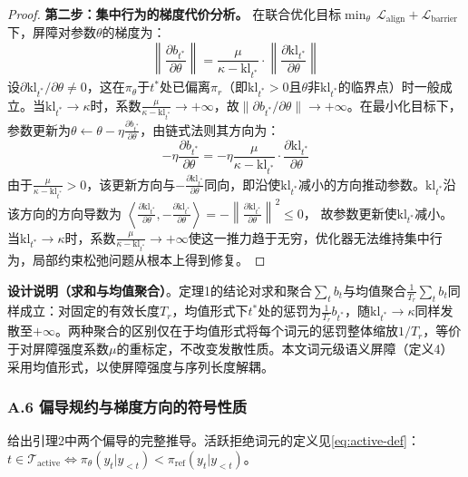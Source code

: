 \documentclass[lettersize,journal]{IEEEtran}
\begin{document}
\begin{proof}
\textbf{第二步：集中行为的梯度代价分析。}
在联合优化目标$\min_\theta\,\mathcal{L}_{\text{align}} + \mathcal{L}_{\text{barrier}}$下，屏障对参数$\theta$的梯度为：
\begin{equation}
    \left\|\frac{\partial b_{t^*}}{\partial \theta}\right\| = 
    \frac{\mu}{\kappa - \mathrm{kl}_{t^*}} \cdot 
    \left\|\frac{\partial \mathrm{kl}_{t^*}}{\partial \theta}\right\|
\end{equation}
设$\partial \mathrm{kl}_{t^*}/\partial \theta \neq 0$，这在$\pi_\theta$于$t^*$处已偏离$\pi_r$（即$\mathrm{kl}_{t^*} > 0$且$\theta$非$\mathrm{kl}_{t^*}$的临界点）时一般成立。当$\mathrm{kl}_{t^*} \to \kappa$时，系数$\frac{\mu}{\kappa - \mathrm{kl}_{t^*}} \to +\infty$，故$\|\partial b_{t^*}/\partial\theta\| \to +\infty$。在最小化目标下，参数更新为$\theta \leftarrow \theta - \eta\frac{\partial b_{t^*}}{\partial\theta}$，由链式法则其方向为：
\begin{equation}
-\eta\frac{\partial b_{t^*}}{\partial\theta} = 
-\eta\frac{\mu}{\kappa - \mathrm{kl}_{t^*}}\cdot
\frac{\partial\mathrm{kl}_{t^*}}{\partial\theta}
\end{equation}
由于$\frac{\mu}{\kappa-\mathrm{kl}_{t^*}} > 0$，该更新方向与$-\frac{\partial\mathrm{kl}_{t^*}}{\partial\theta}$同向，即沿使$\mathrm{kl}_{t^*}$减小的方向推动参数。$\mathrm{kl}_{t^*}$沿该方向的方向导数为
$\left\langle\frac{\partial\mathrm{kl}_{t^*}}{\partial\theta},
-\frac{\partial\mathrm{kl}_{t^*}}{\partial\theta}\right\rangle
= -\left\|\frac{\partial\mathrm{kl}_{t^*}}{\partial\theta} \right\|^2 \leq 0$，
故参数更新使$\mathrm{kl}_{t^*}$减小。当$\mathrm{kl}_{t^*} \to \kappa$时，系数$\frac{\mu}{\kappa - \mathrm{kl}_{t^*}} \to +\infty$使这一推力趋于无穷，优化器无法维持集中行为，局部约束松弛问题从根本上得到修复。
\end{proof}

\textbf{设计说明（求和与均值聚合）}。定理1的结论对求和聚合$\sum_t b_t$与均值聚合$\frac{1}{T_r}\sum_t b_t$同样成立：对固定的有效长度$T_r$，均值形式下$t^*$处的惩罚为$\frac{1}{T_r}b_{t^*}$，随$\mathrm{kl}_{t^*} \to \kappa$同样发散至$+\infty$。两种聚合的区别仅在于均值形式将每个词元的惩罚整体缩放$1/T_r$，等价于对屏障强度系数$\mu$的重标定，不改变发散性质。本文词元级语义屏障（定义4）采用均值形式，以使屏障强度与序列长度解耦。

\subsubsection*{A.6 偏导规约与梯度方向的符号性质}\label{app:active-partial}
给出引理2中两个偏导的完整推导。活跃拒绝词元的定义见\eqref{eq:active-def}：$t \in \mathcal{T}_{\text{active}} \iff \pi_\theta(y_t|y_{<t}) < \pi_{\text{ref}}(y_t|y_{<t})$。
\end{document}
